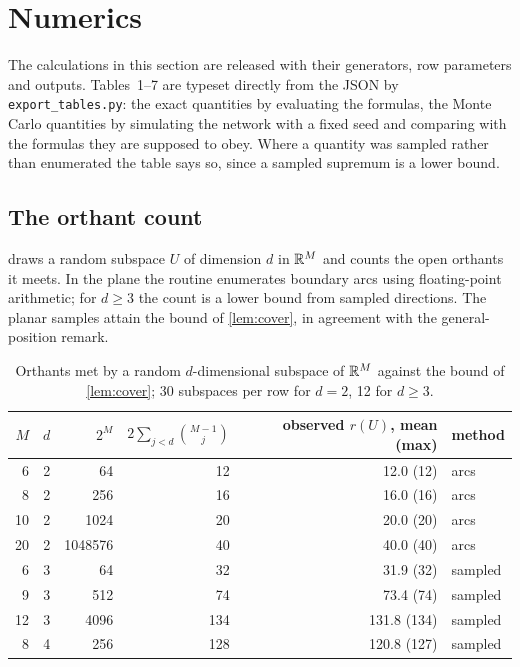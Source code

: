 \section{Numerics}
\label{sec:numerics}

The calculations in this section are released with their generators, row parameters and outputs. Tables~1--7 are typeset directly from the JSON by \texttt{export\_tables.py}: the exact quantities by evaluating the formulas, the Monte Carlo quantities by simulating the network with a fixed seed and comparing with the formulas they are supposed to obey. Where a quantity was sampled rather than enumerated the table says so, since a sampled supremum is a lower bound.

\subsection{The orthant count}

 draws a random subspace $U$ of dimension $d$ in $\mathbb{R}^M$ and counts the open orthants it meets. In the plane the routine enumerates boundary arcs using floating-point arithmetic; for $d\ge3$ the count is a lower bound from sampled directions. The planar samples attain the bound of \cref{lem:cover}, in agreement with the general-position remark.

\begin{table}[h]\centering
\begin{tabular}{rrrrrl}
\toprule
$M$ & $d$ & $2^M$ & $2\sum_{j<d}\binom{M-1}j$ & observed $r(U)$, mean (max) & method\\
\midrule
6 & 2 & 64 & 12 & 12.0 (12) & arcs\\
8 & 2 & 256 & 16 & 16.0 (16) & arcs\\
10 & 2 & 1024 & 20 & 20.0 (20) & arcs\\
20 & 2 & 1048576 & 40 & 40.0 (40) & arcs\\
6 & 3 & 64 & 32 & 31.9 (32) & sampled\\
9 & 3 & 512 & 74 & 73.4 (74) & sampled\\
12 & 3 & 4096 & 134 & 131.8 (134) & sampled\\
8 & 4 & 256 & 128 & 120.8 (127) & sampled\\
\bottomrule
\end{tabular}
\caption{Orthants met by a random $d$-dimensional subspace of $\mathbb{R}^M$ against the bound of \cref{lem:cover}; 30 subspaces per row for $d=2$, 12 for $d\ge3$.}
\label{tab:cover}
\end{table}

